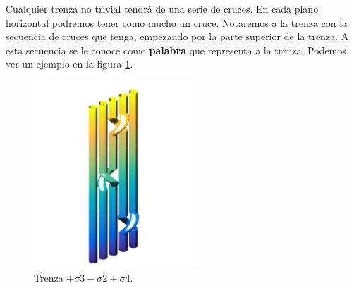 \documentclass[14pt]{extarticle}
\begin{document}
Cualquier trenza no trivial tendrá de una serie de cruces. En cada plano horizontal podremos tener como mucho un cruce. Notaremos a la trenza con la secuencia de cruces que tenga, empezando por la parte superior de la trenza. A esta secuencia se le conoce como \textbf{palabra} que representa a la trenza. Podemos ver un ejemplo en la figura \ref{tren5}.\\
   \begin{figure}[h!]
   	\centering
   	\includegraphics[width=6cm]{itrenzas/t7.png}
   	\caption{Trenza $+\sigma3-\sigma2+\sigma4$.}
   	\label{tren5} 
   \end{figure}
\end{document}
